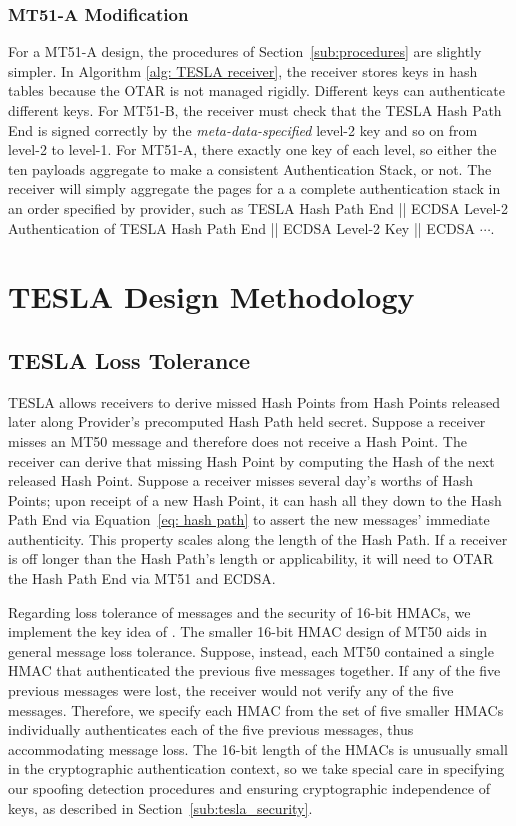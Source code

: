 \documentclass[letterpaper,times]{IONconf/IONconf}
\begin{document}
		\subsubsection{MT51-A Modification}

			For a MT51-A design, the procedures of Section~\ref{sub:procedures} are slightly simpler.
			In Algorithm \ref{alg: TESLA receiver}, the receiver stores keys in hash tables because the OTAR is not managed rigidly.
			Different keys can authenticate different keys.
			For MT51-B, the receiver must check that the TESLA Hash Path End is signed correctly by the {\em meta-data-specified} level-2 key and so on from level-2 to level-1. 
			For MT51-A, there exactly one key of each level, so either the ten payloads aggregate to make a consistent Authentication Stack, or not.
			The receiver will simply aggregate the pages for a a complete authentication stack in an order specified by provider, such as TESLA Hash Path End || ECDSA Level-2 Authentication of TESLA Hash Path End || ECDSA Level-2 Key || ECDSA $\cdots$.

\section{TESLA Design Methodology} \label{sec:tesla_design_methodology}

	\subsection{TESLA Loss Tolerance} \label{sub:tesla_loss_tolerance}

		TESLA allows receivers to derive missed Hash Points from Hash Points released later along Provider's precomputed Hash Path held secret.
		Suppose a receiver misses an MT50 message and therefore does not receive a Hash Point.
		The receiver can derive that missing Hash Point by computing the Hash of the next released Hash Point.
		Suppose a receiver misses several day's worths of Hash Points; upon receipt of a new Hash Point, it can hash all they down to the Hash Path End via Equation~\eqref{eq: hash path} to assert the new messages' immediate authenticity.
		This property scales along the length of the Hash Path.
		If a receiver is off longer than the Hash Path's length or applicability, it will need to OTAR the Hash Path End via MT51 and ECDSA.

		Regarding loss tolerance of messages and the security of 16-bit HMACs, we implement the key idea of \cite{Neish_Dissertation}.
		The smaller 16-bit HMAC design of MT50 aids in general message loss tolerance.
		Suppose, instead, each MT50 contained a single HMAC that authenticated the previous five messages together.
		If any of the five previous messages were lost, the receiver would not verify any of the five messages.
		Therefore, we specify each HMAC from the set of five smaller HMACs individually authenticates each of the five previous messages, thus accommodating message loss.
		The 16-bit length of the HMACs is unusually small in the cryptographic authentication context, so we take special care in specifying our spoofing detection procedures and ensuring cryptographic independence of keys, as described in Section~\ref{sub:tesla_security}.
\end{document}
